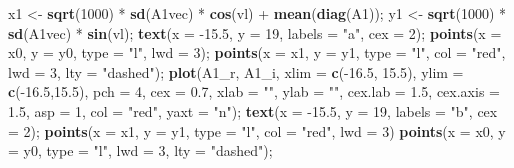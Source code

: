 \documentclass[]{article}
\newenvironment{Shaded}{\begin{snugshade}}{\end{snugshade}}
\newcommand{\KeywordTok}[1]{\textcolor[rgb]{0.13,0.29,0.53}{\textbf{{#1}}}}
\newcommand{\DataTypeTok}[1]{\textcolor[rgb]{0.13,0.29,0.53}{{#1}}}
\newcommand{\DecValTok}[1]{\textcolor[rgb]{0.00,0.00,0.81}{{#1}}}
\newcommand{\FloatTok}[1]{\textcolor[rgb]{0.00,0.00,0.81}{{#1}}}
\newcommand{\StringTok}[1]{\textcolor[rgb]{0.31,0.60,0.02}{{#1}}}
\newcommand{\NormalTok}[1]{{#1}}
\begin{document}
\begin{Shaded}
\begin{Highlighting}[]
    \NormalTok{x1 <-}\StringTok{ }\KeywordTok{sqrt}\NormalTok{(}\DecValTok{1000}\NormalTok{) *}\StringTok{ }\KeywordTok{sd}\NormalTok{(A1vec) *}\StringTok{ }\KeywordTok{cos}\NormalTok{(vl) +}\StringTok{ }\KeywordTok{mean}\NormalTok{(}\KeywordTok{diag}\NormalTok{(A1));}
    \NormalTok{y1 <-}\StringTok{ }\KeywordTok{sqrt}\NormalTok{(}\DecValTok{1000}\NormalTok{) *}\StringTok{ }\KeywordTok{sd}\NormalTok{(A1vec) *}\StringTok{ }\KeywordTok{sin}\NormalTok{(vl);}
    \KeywordTok{text}\NormalTok{(}\DataTypeTok{x =} \NormalTok{-}\FloatTok{15.5}\NormalTok{, }\DataTypeTok{y =} \DecValTok{19}\NormalTok{, }\DataTypeTok{labels =} \StringTok{"a"}\NormalTok{, }\DataTypeTok{cex =} \DecValTok{2}\NormalTok{);}
    \KeywordTok{points}\NormalTok{(}\DataTypeTok{x =} \NormalTok{x0, }\DataTypeTok{y =} \NormalTok{y0, }\DataTypeTok{type =} \StringTok{"l"}\NormalTok{, }\DataTypeTok{lwd =} \DecValTok{3}\NormalTok{);}
    \KeywordTok{points}\NormalTok{(}\DataTypeTok{x =} \NormalTok{x1, }\DataTypeTok{y =} \NormalTok{y1, }\DataTypeTok{type =} \StringTok{"l"}\NormalTok{, }\DataTypeTok{col =} \StringTok{"red"}\NormalTok{, }\DataTypeTok{lwd =} \DecValTok{3}\NormalTok{, }\DataTypeTok{lty =} \StringTok{"dashed"}\NormalTok{);}
    \KeywordTok{plot}\NormalTok{(A1_r, A1_i, }\DataTypeTok{xlim =} \KeywordTok{c}\NormalTok{(-}\FloatTok{16.5}\NormalTok{, }\FloatTok{15.5}\NormalTok{), }\DataTypeTok{ylim =} \KeywordTok{c}\NormalTok{(-}\FloatTok{16.5}\NormalTok{,}\FloatTok{15.5}\NormalTok{), }\DataTypeTok{pch =} \DecValTok{4}\NormalTok{, }\DataTypeTok{cex =} \FloatTok{0.7}\NormalTok{,}
         \DataTypeTok{xlab =} \StringTok{""}\NormalTok{, }\DataTypeTok{ylab =} \StringTok{""}\NormalTok{, }\DataTypeTok{cex.lab =} \FloatTok{1.5}\NormalTok{, }\DataTypeTok{cex.axis =} \FloatTok{1.5}\NormalTok{, }\DataTypeTok{asp =} \DecValTok{1}\NormalTok{, }\DataTypeTok{col =} \StringTok{"red"}\NormalTok{,}
         \DataTypeTok{yaxt =} \StringTok{"n"}\NormalTok{);}
    \KeywordTok{text}\NormalTok{(}\DataTypeTok{x =} \NormalTok{-}\FloatTok{15.5}\NormalTok{, }\DataTypeTok{y =} \DecValTok{19}\NormalTok{, }\DataTypeTok{labels =} \StringTok{"b"}\NormalTok{, }\DataTypeTok{cex =} \DecValTok{2}\NormalTok{);}
    \KeywordTok{points}\NormalTok{(}\DataTypeTok{x =} \NormalTok{x1, }\DataTypeTok{y =} \NormalTok{y1, }\DataTypeTok{type =} \StringTok{"l"}\NormalTok{, }\DataTypeTok{col =} \StringTok{"red"}\NormalTok{, }\DataTypeTok{lwd =} \DecValTok{3}\NormalTok{)}
    \KeywordTok{points}\NormalTok{(}\DataTypeTok{x =} \NormalTok{x0, }\DataTypeTok{y =} \NormalTok{y0, }\DataTypeTok{type =} \StringTok{"l"}\NormalTok{, }\DataTypeTok{lwd =} \DecValTok{3}\NormalTok{, }\DataTypeTok{lty =} \StringTok{"dashed"}\NormalTok{);}

\end{Highlighting}
\end{Shaded}
\end{document}
